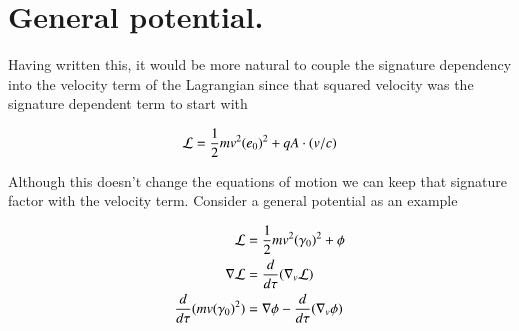 \documentclass{article}
\newcommand{\grad}[0]{\nabla}
\newcommand{\LL}[0]{\mathcal{L}}
\begin{document}
\section{ General potential. }

Having written this, it would be more natural to couple the signature dependency into the velocity term of the Lagrangian since that squared velocity was the 
signature dependent term to start with

\begin{align*}
\LL &= \inv{2} m v^2 (e_0)^2 + q A \cdot (v/c) \\
\end{align*}

Although this doesn't change the equations of motion we can keep that signature factor with the velocity term.  Consider a general potential as an example

\begin{align*}
\LL &= \inv{2}m v^2 (\gamma_0)^2 + \phi \\
\grad \LL &= \frac{d}{d\tau}(\grad_v \LL) \\
\frac{d}{d\tau}(m v (\gamma_0)^2) &= \grad \phi - \frac{d}{d\tau}(\grad_v \phi) \\
\end{align*}


%
%

\end{document}
